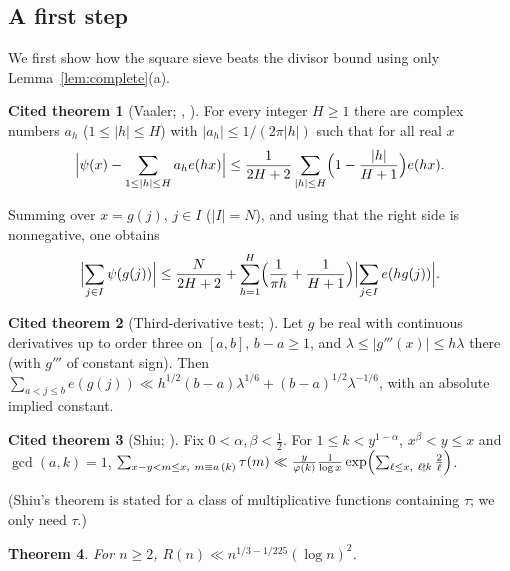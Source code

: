 \documentclass[11pt,reqno]{amsart}
\newtheorem{theorem}{Theorem}[section]
\theoremstyle{definition}
\newtheorem{citedthm}[theorem]{Cited theorem}
\begin{document}
\subsection{A first step}\label{subsec:first}
We first show how the square sieve beats the divisor bound using only
Lemma~\ref{lem:complete}(a).

\begin{citedthm}[Vaaler; {\cite[Thm.~A.6]{GK}, \cite{Vaaler}}]\label{cit:vaaler}
For every integer $H\ge1$ there are complex numbers $a_h$ ($1\le|h|\le H$) with
$|a_h|\le1/(2\pi|h|)$ such that for all real $x$
\[
 \Bigl|\psi(x)-\sum_{1\le|h|\le H}a_he(hx)\Bigr|\le\frac1{2H+2}
 \sum_{|h|\le H}\Bigl(1-\frac{|h|}{H+1}\Bigr)e(hx).
\]
\end{citedthm}
Summing over $x=g(j)$, $j\in I$ ($|I|=N$), and using that the right side is
nonnegative, one obtains
\begin{equation}\label{eq:vaaler}
 \Bigl|\sum_{j\in I}\psi(g(j))\Bigr|\le\frac N{2H+2}
 +\sum_{h=1}^H\Bigl(\frac1{\pi h}+\frac1{H+1}\Bigr)
 \Bigl|\sum_{j\in I}e(hg(j))\Bigr| .
\end{equation}

\begin{citedthm}[Third-derivative test; {\cite[Thm.~5.11]{Titchmarsh}}]\label{cit:3d}
Let $g$ be real with continuous derivatives up to order three on
$[a,b]$, $b-a\ge1$, and $\lambda\le|g'''(x)|\le h\lambda$ there (with
$g'''$ of constant sign).  Then
$\sum_{a<j\le b}e(g(j))\ll h^{1/2}(b-a)\lambda^{1/6}+(b-a)^{1/2}\lambda^{-1/6}$,
with an absolute implied constant.
\end{citedthm}

\begin{citedthm}[Shiu; {\cite[Thm.~1]{Shiu}}]\label{cit:shiu}
Fix $0<\alpha,\beta<\frac12$.  For $1\le k<y^{1-\alpha}$, $x^\beta<y\le x$
and $\gcd(a,k)=1$,
$\sum_{x-y<m\le x,\ m\equiv a\,(k)}\tau(m)\ll\frac{y}{\varphi(k)}\frac1{\log
x}\exp\Bigl(\sum_{\ell\le x,\ \ell\nmid k}\frac2\ell\Bigr)$.
\end{citedthm}
(Shiu's theorem is stated for a class of multiplicative functions
containing $\tau$; we only need $\tau$.)

\begin{theorem}\label{thm:first}
For $n\ge2$, $R(n)\ll n^{1/3-1/225}(\log n)^2$.
\end{theorem}
\end{document}

